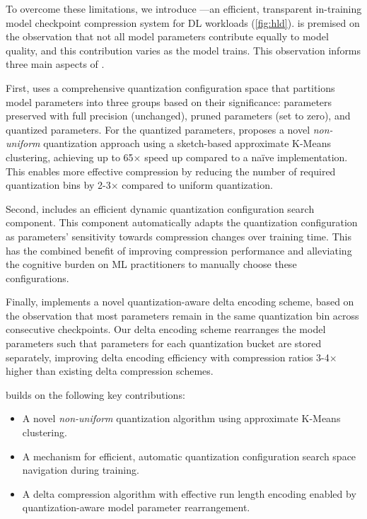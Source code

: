 

To overcome these limitations, we introduce \sys---an efficient, transparent in-training model checkpoint compression system for DL workloads (\autoref{fig:hld}). \sys is premised on the observation that not all model parameters contribute equally to model quality, and this contribution varies as the model trains. This observation informs three main aspects of \sys.

First, \sys uses a comprehensive quantization configuration space that partitions model parameters into three groups based on their significance: parameters preserved with full precision (unchanged), pruned parameters (set to zero), and quantized parameters. For the quantized parameters, \sys proposes a novel \textit{non-uniform} quantization approach using a sketch-based approximate K-Means clustering, achieving up to 65$
\times$ speed up compared to a na\"ive implementation. This enables more effective compression by reducing the number of required quantization bins by 2-3$\times$ compared to uniform quantization. 


Second, \sys includes an efficient dynamic quantization configuration search component. This component automatically adapts the quantization configuration as parameters' sensitivity towards compression changes over training time. This has the combined benefit of improving compression performance and alleviating the cognitive burden on ML practitioners to manually choose these configurations.

Finally, \sys implements a novel quantization-aware delta encoding scheme, based on the observation that most parameters remain in the same quantization bin across consecutive checkpoints.
Our delta encoding scheme rearranges the model parameters such that parameters for each quantization bucket are stored separately, improving delta encoding efficiency with compression ratios 3-4$\times$ higher than existing delta compression schemes.











\sys builds on the following key contributions:

\begin{itemize}
\item A novel \textit{non-uniform} quantization algorithm using approximate K-Means clustering. 
\item A mechanism for efficient, automatic quantization configuration search space navigation during training.
\item A delta compression algorithm with effective run length encoding enabled by quantization-aware model parameter rearrangement.


\end{itemize}

